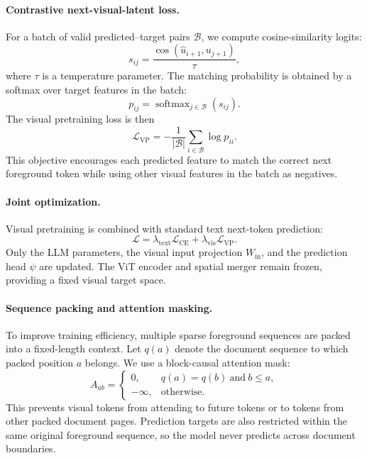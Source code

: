 \paragraph{Contrastive next-visual-latent loss.}
For a batch of valid predicted--target pairs $\mathcal{B}$, we compute cosine-similarity logits:
\begin{equation}
s_{ij}
=
\frac{\cos(\hat{u}_{i+1},u_{j+1})}{\tau},
\label{eq:appendix_vp_logits}
\end{equation}
where $\tau$ is a temperature parameter. The matching probability is obtained by a softmax over target features in the batch:
\begin{equation}
p_{ij}
=
\operatorname{softmax}_{j\in\mathcal{B}}(s_{ij}).
\label{eq:appendix_vp_softmax}
\end{equation}
The visual pretraining loss is then
\begin{equation}
\mathcal{L}_{\mathrm{VP}}
=
-\frac{1}{|\mathcal{B}|}
\sum_{i\in\mathcal{B}}
\log p_{ii}.
\label{eq:appendix_vp_loss}
\end{equation}
This objective encourages each predicted feature to match the correct next foreground token while using other visual features in the batch as negatives.

\paragraph{Joint optimization.}
Visual pretraining is combined with standard text next-token prediction:
\begin{equation}
\mathcal{L}
=
\lambda_{\mathrm{text}}\mathcal{L}_{\mathrm{CE}}
+
\lambda_{\mathrm{vis}}\mathcal{L}_{\mathrm{VP}}.
\label{eq:appendix_joint_loss}
\end{equation}
Only the LLM parameters, the visual input projection $W_{\mathrm{in}}$, and the prediction head $\psi$ are updated. The ViT encoder and spatial merger remain frozen, providing a fixed visual target space.

\paragraph{Sequence packing and attention masking.}
To improve training efficiency, multiple sparse foreground sequences are packed into a fixed-length context. Let $q(a)$ denote the document sequence to which packed position $a$ belongs. We use a block-causal attention mask:
\begin{equation}
A_{ab}
=
\begin{cases}
0, & q(a)=q(b)\ \text{and}\ b\leq a,\\
-\infty, & \text{otherwise}.
\end{cases}
\label{eq:appendix_block_causal_mask}
\end{equation}
This prevents visual tokens from attending to future tokens or to tokens from other packed document pages. Prediction targets are also restricted within the same original foreground sequence, so the model never predicts across document boundaries.
